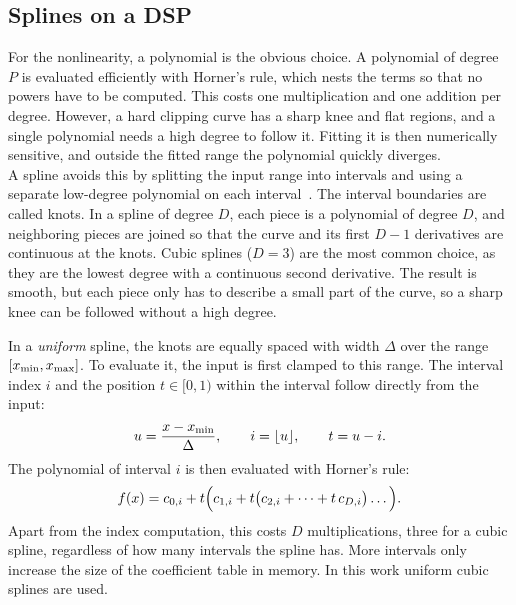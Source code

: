 \subsection{Splines on a DSP}
\label{subsec:background_splines}

For the nonlinearity, a polynomial is the obvious choice. A polynomial of degree $P$ is evaluated efficiently with Horner's rule, which nests the terms so that no powers have to be computed. This costs one multiplication and one addition per degree. However, a hard clipping curve has a sharp knee and flat regions, and a single polynomial needs a high degree to follow it. Fitting it is then numerically sensitive, and outside the fitted range the polynomial quickly diverges.\\

A spline avoids this by splitting the input range into intervals and using a separate low-degree polynomial on each interval~\cite{deboor2001splines}. The interval boundaries are called knots. In a spline of degree $D$, each piece is a polynomial of degree $D$, and neighboring pieces are joined so that the curve and its first $D-1$ derivatives are continuous at the knots. Cubic splines ($D = 3$) are the most common choice, as they are the lowest degree with a continuous second derivative. The result is smooth, but each piece only has to describe a small part of the curve, so a sharp knee can be followed without a high degree.

In a \emph{uniform} spline, the knots are equally spaced with width $\Delta$ over the range $[x\sb{\min}, x\sb{\max}]$. To evaluate it, the input is first clamped to this range. The interval index $i$ and the position $t \in [0, 1)$ within the interval follow directly from the input:
\begin{equation}
  u = \frac{x - x\sb{\min}}{\Delta}, \qquad i = \lfloor u \rfloor, \qquad t = u - i.
  \label{eq:spline_index}
\end{equation}
The polynomial of interval $i$ is then evaluated with Horner's rule:
\begin{equation}
  f(x) = c\sb{0,i} + t\Big(c\sb{1,i} + t\big(c\sb{2,i} + \dots + t\, c\sb{D,i}\big)\dots\Big).
  \label{eq:spline_eval}
\end{equation}
Apart from the index computation, this costs $D$ multiplications, three for a cubic spline, regardless of how many intervals the spline has. More intervals only increase the size of the coefficient table in memory. In this work uniform cubic splines are used.


